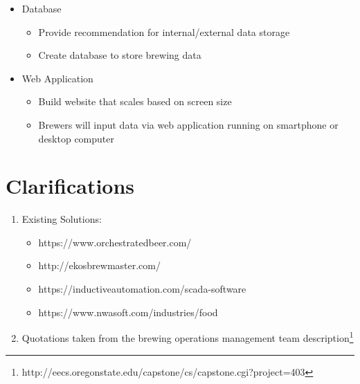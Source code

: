 \documentclass[draftclsnofoot,onecolumn,letterpaper,10pt]{IEEEtran}
\begin{document}
\begin{itemize}
\item {Database}
\begin{itemize}
\item {Provide recommendation for internal/external data storage}
\item {Create database to store brewing data}
\end{itemize}
\item{Web Application}
\begin{itemize}
\item {Build website that scales based on screen size}
\item {Brewers will input data via web application running on smartphone or desktop computer}
\end{itemize}
\end{itemize}

\section{\textbf{Clarifications}}
\begin{enumerate}
	\item {Existing Solutions:}
	\begin{itemize}
		\item {https://www.orchestratedbeer.com/}
		\item {http://ekosbrewmaster.com/}
		\item {https://inductiveautomation.com/scada-software}
		\item {https://www.nwasoft.com/industries/food}
	\end{itemize}
	\item {Quotations taken from the brewing operations management team description\footnote{http://eecs.oregonstate.edu/capstone/cs/capstone.cgi?project=403}}
\end{enumerate}
\end{document}
